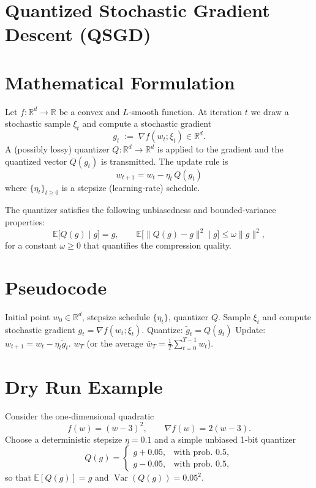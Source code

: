 \documentclass{article}
\begin{document}
\section*{Quantized Stochastic Gradient Descent (QSGD)}

\section*{Mathematical Formulation}
Let $f:\mathbb{R}^d\rightarrow\mathbb{R}$ be a convex and $L$‑smooth function.  
At iteration $t$ we draw a stochastic sample $\xi_t$ and compute a stochastic gradient
\[
g_t \;:=\; \nabla f(w_t;\xi_t)\in\mathbb{R}^d .
\]
A (possibly lossy) quantizer $Q:\mathbb{R}^d\rightarrow\mathbb{R}^d$ is applied to the gradient
and the quantized vector $Q(g_t)$ is transmitted. The update rule is
\[
\boxed{\,w_{t+1}=w_t-\eta_t\, Q(g_t)\,}
\]
where $\{\eta_t\}_{t\ge 0}$ is a stepsize (learning‑rate) schedule.  

The quantizer satisfies the following unbiasedness and bounded‑variance properties:
\[
\mathbb{E}\!\big[ Q(g)\mid g\big]=g,\qquad
\mathbb{E}\!\big[\|Q(g)-g\|^2\mid g\big]\le \omega\|g\|^2,
\tag{1}
\]
for a constant $\omega\ge 0$ that quantifies the compression quality.

\section*{Pseudocode}
\begin{algorithm}[H]
\caption{Quantized Stochastic Gradient Descent}
\begin{algorithmic}[1]
\REQUIRE Initial point $w_0\in\mathbb{R}^d$, stepsize schedule $\{\eta_t\}$, quantizer $Q$.
    \STATE Sample $\xi_t$ and compute stochastic gradient $g_t=\nabla f(w_t;\xi_t)$.
    \STATE Quantize: $\tilde g_t = Q(g_t)$   
    \STATE Update: $w_{t+1}=w_t-\eta_t \tilde g_t$.
\ENDFOR
\RETURN $w_T$ (or the average $\bar w_T=\frac1T\sum_{t=0}^{T-1}w_t$).
\end{algorithmic}
\end{algorithm}

\section*{Dry Run Example}
Consider the one‑dimensional quadratic
\[
f(w)=(w-3)^2,\qquad \nabla f(w)=2(w-3).
\]
Choose a deterministic stepsize $\eta=0.1$ and a simple unbiased 1‑bit quantizer
\[
Q(g)=
\begin{cases}
g+0.05, &\text{with prob. }0.5,\\
g-0.05, &\text{with prob. }0.5,
\end{cases}
\]
so that $\mathbb{E}[Q(g)]=g$ and $\operatorname{Var}(Q(g))=0.05^2$.
\end{document}
